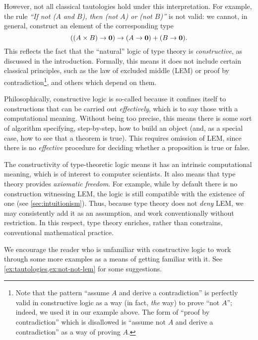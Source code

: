 However, not all classical tautologies hold under this interpretation.
For example, the rule 
\emph{``If not ($A$ and $B$), then (not $A$) or (not $B$)''} is not valid: we cannot, in general, construct an element of the corresponding type
\[ ((A \times B) \to \mathbf{0}) \to (A \to \mathbf{0}) + (B \to \mathbf{0}).\]
This reflects the fact that the ``natural'' logic of type theory is \emph{constructive}, as discussed in the introduction.
Formally, this means it does not include certain classical principles, such as the law of excluded middle (LEM) or proof by contradiction\footnote{Note that the pattern ``assume $A$ and derive a contradiction'' is perfectly valid in constructive logic as a way (in fact, \emph{the} way) to prove ``not $A$''; indeed, we used it in our example above. The form of ``proof by contradiction'' which is disallowed is ``assume not $A$ and derive a contradiction'' as a way of proving $A$.},
and others which depend on them.

Philosophically, constructive logic is so-called because it confines itself to constructions that can be carried out \emph{effectively}, which is to say those with a computational meaning.
Without being too precise, this means there is some sort of algorithm specifying, step-by-step, how to build an object (and, as a special case, how to see that a theorem is true).
This requires omission of LEM, since there is no \emph{effective} procedure for deciding whether a proposition is true or false.

The constructivity of type-theoretic logic means it has an intrinsic computational meaning, which is of interest to computer scientists.
It also means that type theory provides \emph{axiomatic freedom}.
For example, while by default there is no construction witnessing LEM, the logic is still compatible with the existence of one (see \autoref{sec:intuitionism}).
Thus, because type theory does not \emph{deny} LEM, we may consistently add it as an assumption, and work conventionally without restriction.
In this respect, type theory enriches, rather than constrains, conventional mathematical practice.

We encourage the reader who is unfamiliar with constructive logic to work through some more examples as a means of getting familiar with it.
See \autoref{ex:tautologies,ex:not-not-lem} for some suggestions.

\mentalpause

